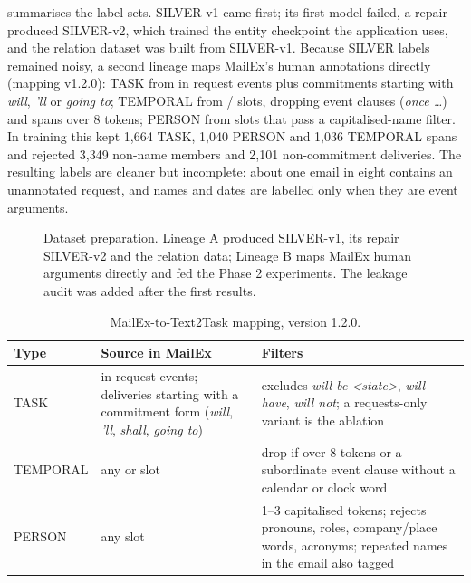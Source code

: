  summarises the label sets. SILVER-v1 came first; its first model failed, a repair produced SILVER-v2, which trained the entity checkpoint the application uses, and the relation dataset was built from SILVER-v1. Because SILVER labels remained noisy, a second lineage maps MailEx's human annotations directly (mapping v1.2.0): TASK from  in request events plus commitments starting with \emph{will}, \emph{'ll} or \emph{going to}; TEMPORAL from / slots, dropping event clauses (\emph{once \ldots}) and spans over 8 tokens; PERSON from  slots that pass a capitalised-name filter. In training this kept 1,664 TASK, 1,040 PERSON and 1,036 TEMPORAL spans and rejected 3,349 non-name members and 2,101 non-commitment deliveries. The resulting labels are cleaner but incomplete: about one email in eight contains an unannotated request, and names and dates are labelled only when they are event arguments.


\begin{figure}[htbp]
\centering
{}
\caption{Dataset preparation. Lineage A produced SILVER-v1, its repair SILVER-v2 and the relation data; Lineage B maps MailEx human arguments directly and fed the Phase 2 experiments. The leakage audit was added after the first results.}
\label{fig:datapipeline}
\end{figure}

\begin{table}[htbp]
\centering
\caption{MailEx-to-Text2Task mapping, version 1.2.0.}
\label{tab:mapping}
\footnotesize
\begin{tabularx}{\linewidth}{@{}p{16mm}LL@{}}
\toprule
Type & Source in MailEx & Filters \\
\midrule
TASK &  in request events; deliveries starting with a commitment form (\emph{will}, \emph{'ll}, \emph{shall}, \emph{going to}) & excludes \emph{will be \textless state\textgreater}, \emph{will have}, \emph{will not}; a requests-only variant is the ablation \\
TEMPORAL & any  or  slot & drop if over 8 tokens or a subordinate event clause without a calendar or clock word \\
PERSON & any  slot & 1--3 capitalised tokens; rejects pronouns, roles, company/place words, acronyms; repeated names in the email also tagged \\
\bottomrule
\end{tabularx}
\end{table}

